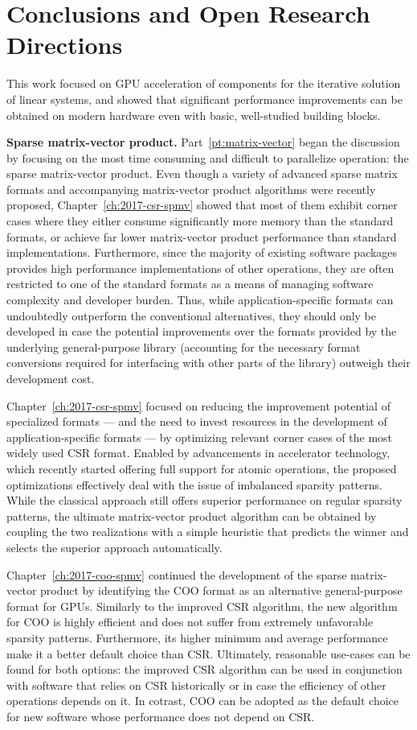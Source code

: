 \section{Conclusions and Open Research Directions}

This work focused on GPU acceleration of components for the iterative solution
of linear systems, and showed that significant performance improvements can be
obtained on modern hardware even with basic, well-studied building blocks.

\noindent \textbf{Sparse matrix-vector product.}
Part~\ref{pt:matrix-vector} began the discussion by focusing on the most time
consuming and difficult to parallelize operation: the sparse matrix-vector
product. Even though a variety of advanced sparse matrix formats and
accompanying matrix-vector product algorithms were recently proposed,
Chapter~\ref{ch:2017-csr-spmv} showed that most of them exhibit corner cases
where they either consume significantly more memory than the standard formats,
or achieve far lower matrix-vector product performance than standard
implementations. Furthermore, since the majority of existing software packages
provides high performance implementations of other operations, they are often
restricted to one of the standard formats as a means of managing software
complexity and developer burden. Thus, while application-specific formats can
undoubtedly outperform the conventional alternatives, they should only be
developed in case the potential improvements over the formats provided by the
underlying general-purpose library (accounting for the necessary format
conversions required for interfacing with other parts of the library) outweigh
their development cost.

Chapter~\ref{ch:2017-csr-spmv} focused on reducing the improvement potential of
specialized formats --- and the need to invest resources in the development of
application-specific formats --- by optimizing relevant corner cases of the most
widely used CSR format.  Enabled by advancements in accelerator technology,
which recently started offering full support for atomic operations, the proposed
optimizations effectively deal with the issue of imbalanced sparsity patterns.
While the classical approach still offers superior performance on regular
sparsity patterns, the ultimate matrix-vector product algorithm can be obtained
by coupling the two realizations with a simple heuristic that predicts the
winner and selects the superior approach automatically.

Chapter~\ref{ch:2017-coo-spmv} continued the development of the sparse
matrix-vector product by identifying the COO format as an alternative
general-purpose format for GPUs. Similarly to the improved CSR algorithm, the
new algorithm for COO is highly efficient and does not suffer from extremely
unfavorable sparsity patterns. Furthermore, its higher minimum and average
performance make it a better default choice than CSR. Ultimately, reasonable
use-cases can be found for both options: the improved CSR algorithm can be used
in conjunction with software that relies on CSR historically or in case the
efficiency of other operations depends on it. In cotrast, COO can be adopted as
the default choice for new software whose performance does not depend on CSR.

